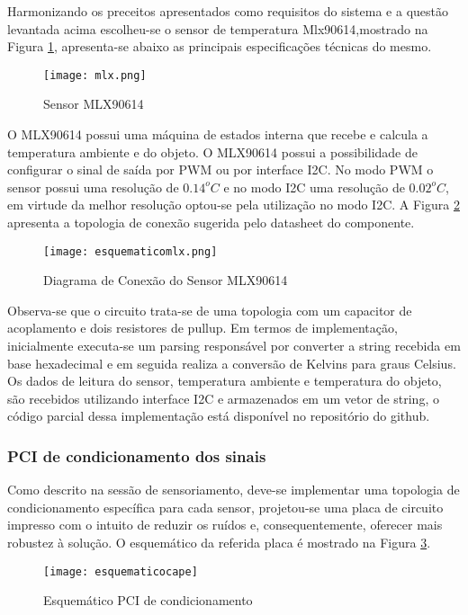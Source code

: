 		Harmonizando os preceitos apresentados como requisitos do sistema e a questão levantada acima escolheu-se o sensor de temperatura Mlx90614,mostrado na Figura \ref{mlx}, apresenta-se abaixo as principais especificações técnicas do mesmo.

		\begin{figure}[!h]
			\centering
			\texttt{[image: mlx.png]}
			\caption{Sensor MLX90614}
			\label{mlx}
		\end{figure}

		O MLX90614 possui uma máquina de estados interna que recebe e calcula a temperatura ambiente e do objeto. O MLX90614 possui a possibilidade de configurar o sinal de saída por PWM ou por interface I2C. No modo PWM o sensor possui uma resolução de $0.14^oC$ e no modo I2C uma resolução de $0.02^oC$, em virtude da melhor resolução optou-se pela utilização no modo I2C. A Figura \ref{esquematicomlx} apresenta a topologia de conexão sugerida pelo datasheet do componente. 

		\begin{figure}[!h]
			\centering
			\texttt{[image: esquematicomlx.png]}
			\caption{Diagrama de Conexão do Sensor MLX90614}
			\label{esquematicomlx}
		\end{figure}

		Observa-se que o circuito trata-se de uma topologia com um capacitor de acoplamento e dois resistores de pullup. Em termos de implementação, inicialmente executa-se um parsing responsável por converter a string recebida em base hexadecimal e em seguida realiza a conversão de Kelvins para graus Celsius.
		Os dados de leitura do sensor, temperatura ambiente e temperatura do objeto, são recebidos utilizando interface I2C e armazenados em um vetor de string, o código parcial dessa implementação está disponível no repositório do github.


\subsubsection{PCI de condicionamento dos sinais}

	Como descrito na sessão de sensoriamento, deve-se implementar uma topologia de condicionamento específica para cada sensor, projetou-se uma placa de circuito impresso com o intuito de reduzir os ruídos e, consequentemente, oferecer mais robustez à solução. O esquemático da referida placa é mostrado na Figura \ref{cape}. 

	\begin{figure}[!h]
		\centering
		\texttt{[image: esquematicocape]}
		\caption{Esquemático PCI de condicionamento}
		\label{cape}
	\end{figure}

